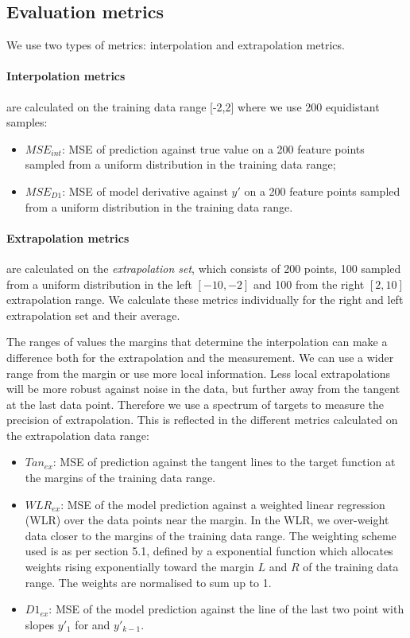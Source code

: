 \documentclass[runningheads]{llncs}
\begin{document}
\subsection{Evaluation metrics}

We use two types of metrics: interpolation and extrapolation metrics.

\paragraph{Interpolation metrics} are calculated on the training data range [-2,2] where we use 200 equidistant samples:
\begin{itemize} 
 \item \textbf{$MSE_{int}$}: MSE of prediction against true value on a 200 feature points sampled from a uniform distribution in the training data range;
 \item \textbf{$MSE_{D1}$}: MSE of model derivative against $y'$ on a 200 feature points sampled from a uniform distribution in the training data range.
\end{itemize}

\paragraph{Extrapolation metrics} are calculated on the \textit{extrapolation set}, which consists of 200 points, 100 sampled from a uniform distribution in the left $[-10,-2]$ and 100 from the right $[2,10]$ extrapolation range.
We calculate these metrics individually for the right and left extrapolation set and their average. 

The ranges of values the margins that determine the interpolation can make a difference both for the extrapolation and the measurement. 
We can use a wider range from the margin or use more local information. 
Less local extrapolations will be more robust against noise in the data, but further away from the tangent at the last data point. 
Therefore we use a spectrum of targets to measure the precision of extrapolation.
This is reflected in the different metrics calculated on the extrapolation data range: 
\begin{itemize} 

 \item \textbf{$Tan_{ex}$}: MSE of prediction against the tangent lines to the target function at the margins of the training data range. 
 \item \textbf{$WLR_{ex}$}: MSE of the model prediction against a weighted linear regression (WLR) over the data points near the margin.
 In the WLR, we over-weight data closer to the margins of the training data range.
 The weighting scheme used is as per \cite{Lopedoto20} section 5.1, defined by a exponential function which allocates weights rising exponentially toward the margin $L$ and $R$ of the training data range.
 The weights are normalised to sum up to 1.
 \item \textbf{$D1_{ex}$}: MSE of the model prediction against the line of the last two point with slopes $y'_{1}$ for and $y'_{k-1}$.
 
\end{itemize}
\end{document}
